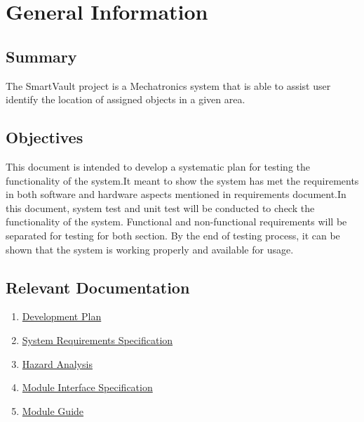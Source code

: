 \documentclass[12pt, titlepage]{article}
\begin{document}
\newpage



\section{General Information}

\subsection{Summary}

The SmartVault project is a Mechatronics system that is able to assist user identify the location of assigned objects in a given area.

\subsection{Objectives}

This document is intended to develop a systematic plan for testing the functionality of the system.It meant to show the system has met the requirements in both software and hardware aspects mentioned in requirements document.In this document, system test and unit test will be conducted to check the functionality of the system. Functional and non-functional requirements will be separated for testing for both section. By the end of testing process, it can be shown that the system is working properly and available for usage.

\subsection{Relevant Documentation}

\begin{enumerate}
    \item \href{https://github.com/Edwardhyw/smartVault/tree/main/docs/DevelopmentPlan}{Development Plan}
    \item \href{https://github.com/Edwardhyw/smartVault/tree/main/docs/SRS}{System Requirements Specification} 
    \item \href{https://github.com/Edwardhyw/smartVault/tree/main/docs/HazardAnalysis}{Hazard Analysis} 
    \item \href{https://github.com/Edwardhyw/smartVault/tree/main/docs/Design/MIS}{Module Interface Specification} 
    \item \href{https://github.com/Edwardhyw/smartVault/tree/main/docs/Design/MG}{Module Guide} 
\end{enumerate}
\end{document}
